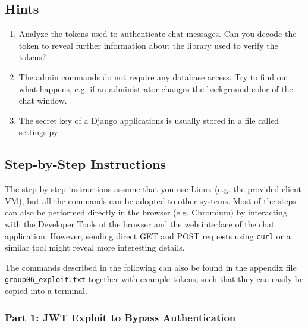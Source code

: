 \documentclass[12pt,a4paper]{article}
\newcommand{\code}[1]{\texttt{#1}}
\begin{document}
\subsection{Hints}
\begin{enumerate}
	\item Analyze the tokens used to authenticate chat messages. Can you decode the token to reveal further information about the library used to verify the tokens?
	\item The admin commands do not require any database access. Try to find out what happens, e.g. if an administrator changes the background color of the chat window.
	\item The secret key of a Django applications is usually stored in a file called settings.py
\end{enumerate}

\subsection{Step-by-Step Instructions}

The step-by-step instructions assume that you use Linux (e.g. the provided client VM), but all the commands can be adopted to other systems. Most of the steps can also be performed directly in the browser (e.g. Chromium) by interacting with the Developer Tools of the browser and the web interface of the chat application. However, sending direct GET and POST requests using \code{curl} or a similar tool might reveal more interesting details.

The commands described in the following can also be found in the appendix file \code{group06\_exploit.txt} together with example tokens, such that they can easily be copied into a terminal.

\subsubsection{Part 1: JWT Exploit to Bypass Authentication}
\end{document}
